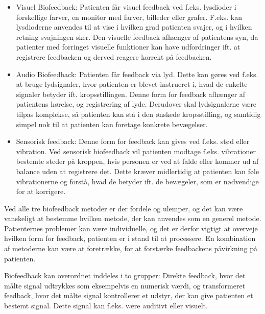 \begin{itemize}
\item Visuel Biofeedback: Patienten får visuel feedback ved f.eks. lysdioder i forskellige farver, en monitor med farver, billeder eller grafer. F.eks. kan lysdioderne anvendes til at vise i hvilken grad patienten svajer, og i hvilken retning svajningen sker.
Den visuelle feedback afhænger af patientens syn, da patienter med forringet visuelle funktioner kan have udfordringer ift. at registrere feedbacken og derved reagere korrekt på feedbacken.  \cite{webster2009,Blanchard1972}  

\item Audio Biofeedback: Patienten får feedback via lyd. Dette kan gøres ved f.eks. at bruge lydsignaler, hvor patienten er blevet instrueret i, hvad de enkelte signaler betyder ift. kropsstillingen. 
Denne form for feedback afhænger af patientens hørelse, og registrering af lyde. Derudover skal lydsignalerne være tilpas komplekse, så patienten kan stå i den ønskede kropsstilling, og samtidig simpel nok til at patienten kan foretage konkrete bevægelser. \cite{webster2009,Blanchard1972}

\item Sensorisk feedback: Denne form for feedback kan gives ved f.eks. stød eller vibration. Ved sensorisk biofeedback vil patienten modtage f.eks. vibrationer bestemte steder på kroppen, hvis personen er ved at falde eller kommer ud af balance uden at registrere det. Dette kræver midlertidig at patienten kan føle vibrationerne og forstå, hvad de betyder ift. de bevægeler, som er nødvendige for at korrigere. \cite{Blanchard1972}           
\end{itemize}
 
Ved alle tre biofeedback metoder er der fordele og ulemper, og det kan være vanskeligt at bestemme hvilken metode, der kan anvendes som en generel metode. Patienternes problemer kan være individuelle, og det er derfor vigtigt at overveje hvilken form for feedback, patienten er i stand til at processere. En kombination af metoderne kan være at foretrække, for at forstærke feedbackens påvirkning på patienten. 

Biofeedback kan overordnet inddeles i to grupper: Direkte feedback, hvor det målte signal udtrykkes som eksempelvis en numerisk værdi, og transformeret feedback, hvor det målte signal kontrollerer et udstyr, der kan give patienten et bestemt signal. Dette signal kan f.eks. være auditivt eller visuelt. \cite{Giggins2013} 


